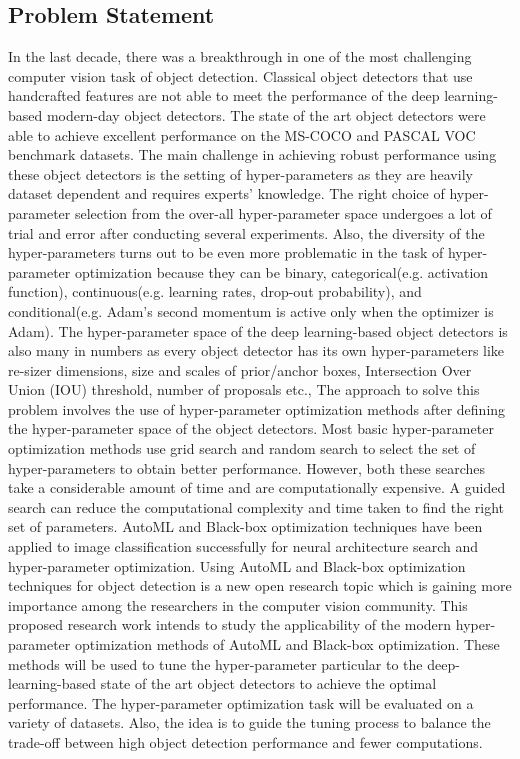\documentclass[thesis]{mas_proposal}
\begin{document}

\subsection{Problem Statement}
In the last decade, there was a breakthrough in one of the most challenging computer vision task of object detection. Classical object detectors that use handcrafted features are not able to meet the performance of the deep learning-based modern-day object detectors\cite{zou2019object}. The state of the art object detectors were able to achieve excellent performance on the MS-COCO\cite{lin2014microsoft} and PASCAL VOC\cite{Everingham10} benchmark datasets. The main challenge in achieving robust performance using these object detectors is the setting of hyper-parameters as they are heavily dataset dependent and requires experts' knowledge. The right choice of hyper-parameter selection from the over-all hyper-parameter space undergoes a lot of trial and error after conducting several experiments. Also, the diversity of the hyper-parameters turns out to be even more problematic in the task of hyper-parameter optimization because they can be binary, categorical(e.g. activation function), continuous(e.g. learning rates, drop-out probability),  and conditional(e.g. Adam's second momentum is active only when the optimizer is Adam)\cite{automl_book}.  The hyper-parameter space of the deep learning-based object detectors is also many in numbers as every object detector has its own hyper-parameters like re-sizer dimensions, size and scales of prior/anchor boxes, Intersection Over Union (IOU) threshold, number of proposals etc., The approach to solve this problem involves the use of hyper-parameter optimization methods after defining the hyper-parameter space of the object detectors. Most basic hyper-parameter optimization methods use grid search\cite{montgomery2001design} and random search\cite{bergstra2012random} to select the set of hyper-parameters to obtain better performance. However, both these searches take a considerable amount of time and are computationally expensive. A guided search can reduce the computational complexity and time taken to find the right set of parameters.  
AutoML and Black-box optimization techniques have been applied to image classification successfully for neural architecture search and hyper-parameter optimization. Using AutoML and Black-box optimization techniques for object detection is a new open research topic which is gaining more importance among the researchers in the computer vision community. This proposed research work intends to study the applicability of the modern hyper-parameter optimization methods of AutoML and Black-box optimization. These methods will be used to tune the hyper-parameter particular to the deep-learning-based state of the art object detectors to achieve the optimal performance.  The hyper-parameter optimization task will be evaluated on a variety of datasets. Also, the idea is to guide the tuning process to balance the trade-off between high object detection performance and fewer computations.
\end{document}
